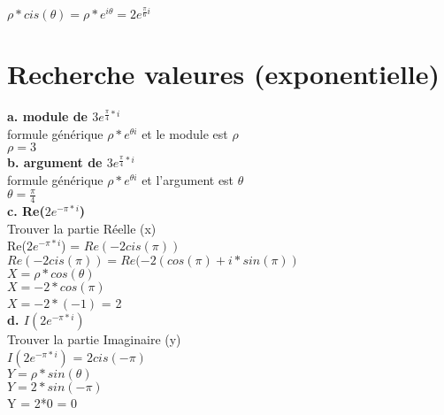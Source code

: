 $\rho*cis(\theta) = \rho * e^{i\theta} = 2e^{\frac{\pi}{6}i}$ \\

\newpage
\section{Recherche valeures (exponentielle)}

\textbf{a. module de $3e^{\frac{\pi}{4}*i}$} \\

formule générique $\rho * e^{\theta i}$ et le module est $\rho$ \\

$\rho = 3 $ \\

\vspace{3mm}
\textbf{b. argument de $3e^{\frac{\pi}{4}*i}$} \\

formule générique $\rho * e^{\theta i}$ et l'argument est $\theta$ \\

$\theta = \frac{\pi}{4} $ \\

\vspace{3mm}
\textbf{c. Re($2e^{-\pi*i}$)} \\

Trouver la partie Réelle (x) \\

Re($2e^{-\pi*i}$) = $ Re(-2cis(\pi))$ \\

$Re(-2cis(\pi)) = Re( - 2 (cos(\pi)+ i*sin(\pi) ) $ \\

$ X = \rho*cos(\theta) $ \\

$ X = -2*cos(\pi) $ \\

$ X = -2*(-1) $ = 2 \\


\vspace{5mm}
\textbf{d. $I(2e^{-\pi*i})$} \\

Trouver la partie Imaginaire (y) \\

$I(2e^{-\pi*i})$ = $2cis(-\pi)$ \\

$ Y = \rho*sin(\theta) $ \\

$ Y = 2*sin(-\pi) $ \\

Y = 2*0 = 0  \\
